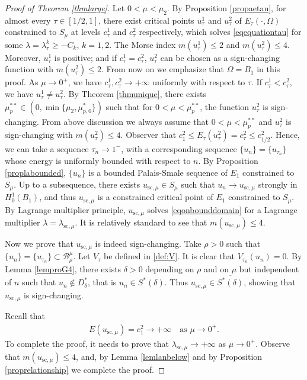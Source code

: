 \documentclass[10pt,a4paper]{article}
\theoremstyle{definition} \theoremstyle{remark}
\numberwithin{equation}{section}
\newcommand{\B}{\mathcal{B}}
\newcommand{\la}{\lambda}
\begin{document}
\begin{proof}[Proof of Theorem \ref{thmlarge}]
	Let $0 < \mu < \mu_2$. By Proposition \ref{propaetau}, for almost every $\tau \in [1/2,1]$, there exist critical points $u_\tau^1$ and $u_\tau^2$ of $E_\tau(\cdot,\Omega)$ constrained to $S_\mu$ at levels $c_\tau^1$ and $c_\tau^2$ respectively, which solves \eqref{eqequationtau} for some $\la = \la_\tau^k \geq -C_k$, $k =1,2$. The Morse index $m(u_\tau^1) \leq 2$ and $m(u_\tau^2) \leq 4$. Moreover, $u_\tau^1$ is positive; and if $c_\tau^1 = c_\tau^2$, $u_\tau^2$ can be chosen as a sign-changing function with $m(u_\tau^2) \leq 2$. From now on we emphasize that $\Omega = B_1$ in this proof. As $\mu \to 0^+$, we have $c_\tau^1, c_\tau^2 \to +\infty$ uniformly with respect to $\tau$. If $c_\tau^1 < c_\tau^2$, we have $u_\tau^1 \neq u_\tau^2$. By Theorem \ref{thmunique}, there exists $\mu^{**}_p \in (0,\min\{\mu_2,\mu^*_{p,0}\})$ such that for $0 < \mu < \mu^{**}_p$, the function $u_\tau^2$ is sign-changing. From above discussion we always assume that $0 < \mu < \mu^{**}_p$ and $u_\tau^2$ is sign-changing with $m(u_\tau^2) \le 4$. Observer that $c_1^2 \le E_\tau(u_\tau^2) = c_\tau^2 \le c_{1/2}^2$. Hence, we can take a sequence $\tau_n \to 1^-$, with a corresponding sequence $\{u_n\} = \{u_{\tau_n}\}$ whose energy is uniformly bounded with respect to $n$. By Proposition \ref{proplabounded}, $\{u_n\}$ is a bounded Palais-Smale sequence of $E_1$ constrained to $S_\mu$. Up to a subsequence, there exists $u_{\text{sc},\mu} \in S_\mu$ such that $u_n \to u_{\text{sc},\mu}$ strongly in $H_0^1(B_1)$, and thus $u_{\text{sc},\mu}$ is a constrained critical point of $E_1$ constrained to $S_\mu$. By Lagrange multiplier principle, $u_{\text{sc},\mu}$ solves \eqref{eqonbounddomain} for a Lagrange multiplier $\la=\la_{\text{sc},\mu}$. It is relatively standard to see that $m(u_{\text{sc},\mu}) \leq 4$.
	
	Now we prove that $u_{\text{sc},\mu}$ is indeed sign-changing. Take $\rho > 0$ such that $\{u_n\} = \{u_{\tau_n}\} \subset \B_\rho^\mu$. Let $V_\tau$ be defined in \eqref{def:V}. It is clear that $V_{\tau_n}(u_n) = 0$. By Lemma \ref{lemproG4}, there exists $\delta > 0$ depending on $\rho$ and on $\mu$ but independent of $n$ such that $u_n \notin D^*_\delta$, that is $u_n \in S^*(\delta)$. Thus $u_{\text{sc},\mu} \in \overline{S^*(\delta)}$, showing that $u_{\text{sc},\mu}$ is sign-changing.
	
	Recall that
	\begin{align} \label{eqelarge}
		E(u_{\text{sc},\mu}) = c_1^2 \to +\infty \quad \text{as } \mu \to 0^+.
	\end{align}
	To complete the proof, it needs to prove that $\la_{\text{sc},\mu} \to +\infty$ as $\mu \to 0^+$. Observe that $m(u_{\text{sc},\mu}) \leq 4$, and, by Lemma \ref{lemlanbelow} and by Proposition \ref{proprelationship} we complete the proof.
\end{proof}
\end{document}

